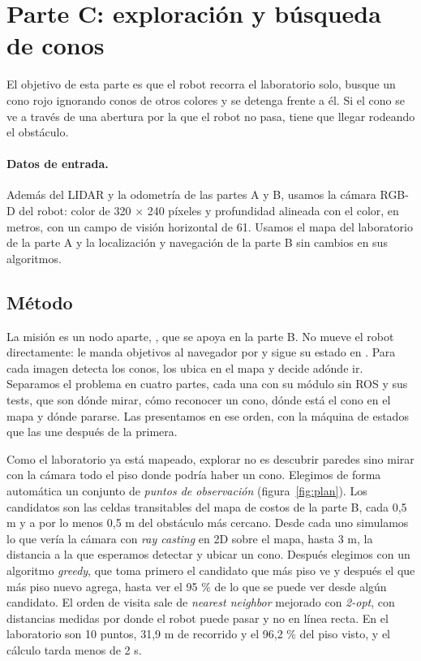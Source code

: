 
\section{Parte C: exploración y búsqueda de conos}

El objetivo de esta parte es que el robot recorra el laboratorio solo, busque
un cono rojo ignorando conos de otros colores y se detenga frente a él. Si el
cono se ve a través de una abertura por la que el robot no pasa, tiene que
llegar rodeando el obstáculo.

\paragraph{Datos de entrada.} Además del LIDAR y la odometría de las partes A
y B, usamos la cámara RGB-D del robot: color de 320 × 240 píxeles y
profundidad alineada con el color, en metros, con un campo de visión
horizontal de 61\textdegree. Usamos el mapa del laboratorio de la parte A y la localización
y navegación de la parte B sin cambios en sus algoritmos.

\subsection{Método}

La misión es un nodo aparte, , que se apoya en la parte B. No
mueve el robot directamente: le manda objetivos al navegador por
 y sigue su estado en . Para cada imagen
detecta los conos, los ubica en el mapa y decide adónde ir. Separamos el
problema en cuatro partes, cada una con su módulo sin ROS y sus tests, que son
dónde mirar, cómo reconocer un cono, dónde está el cono en el mapa y dónde
pararse. Las presentamos en ese orden, con la máquina de estados que las une
después de la primera.

Como el laboratorio ya está mapeado, explorar no es descubrir paredes sino
mirar con la cámara todo el piso donde podría haber un cono. Elegimos de forma automática un conjunto de \emph{puntos de
observación} (figura~\ref{fig:plan}). Los candidatos son las celdas
transitables del mapa de costos de la parte B, cada 0,5 m y a por lo menos
0,5 m del obstáculo más cercano. Desde cada uno simulamos lo que vería la
cámara con \emph{ray casting} en 2D sobre el mapa, hasta 3 m, la distancia a la que
esperamos detectar y ubicar un cono. Después elegimos con un algoritmo
\emph{greedy}, que toma primero el candidato que más piso ve y después el que más piso
nuevo agrega, hasta ver el 95 \% de lo que se puede ver desde algún candidato.
El orden de visita sale de \emph{nearest neighbor} mejorado con \emph{2-opt},
con distancias medidas por donde el robot puede pasar y no en línea recta.
En el laboratorio son 10 puntos, 31,9 m de recorrido y el
96,2 \% del piso visto, y el cálculo tarda menos de 2 s.

